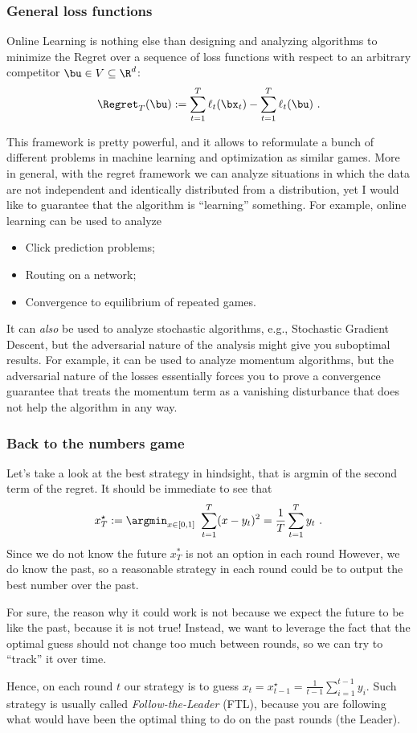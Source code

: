 \documentclass{beamer}
\begin{document}
\begin{frame}
  \frametitle{General loss functions}
Online Learning is nothing else than designing and analyzing algorithms to minimize the Regret over a sequence of loss functions with respect to an arbitrary competitor $\bu \in V\subseteq \R^d$:
\[
\Regret_T(\bu):=\sum_{t=1}^T \ell_t(\bx_t) - \sum_{t=1}^T \ell_t(\bu)~.
\]

This framework is pretty powerful, and it allows to reformulate a bunch of different problems in machine learning and optimization as similar games. More in general, with the regret framework we can analyze situations in which the data are not independent and identically distributed from a distribution, yet I would like to guarantee that the algorithm is ``learning'' something. For example, online learning can be used to analyze
\begin{itemize}
\item Click prediction problems;
\item Routing on a network;
\item Convergence to equilibrium of repeated games.
\end{itemize}
It can \emph{also} be used to analyze stochastic algorithms, e.g., Stochastic Gradient Descent, but the adversarial nature of the analysis might give you suboptimal results. For example, it can be used to analyze momentum algorithms, but the adversarial nature of the losses essentially forces you to prove a convergence guarantee that treats the momentum term as a vanishing disturbance that does not help the algorithm in any way.



\end{frame}


\begin{frame}
  \frametitle{Back to the numbers game}
  Let's take a look at the best strategy in hindsight, that is argmin of the second term of the regret. It should be immediate to see that
  \[
    x^\star_T := \argmin_{x \in [0,1]} \ \sum_{t=1}^T (x - y_t)^2 = \frac{1}{T} \sum_{t=1}^T y_t~.
  \]
  Since we do not know the future $x^*_T$ is not an option in each round
  However, we do know the past, so a reasonable strategy in each round could be to output the best number over the past.

  For sure, the reason why it could work is not because we expect the future to be like the past, because it is not true! Instead, we want to leverage the fact that the optimal guess should not change too much between rounds, so we can try to ``track'' it over time.

  Hence, on each round $t$ our strategy is to guess $x_t = x_{t-1}^\star=\frac{1}{t-1} \sum_{i=1}^{t-1} y_i$. Such strategy is usually called \emph{Follow-the-Leader} (FTL), because you are following what would have been the optimal thing to do on the past rounds (the Leader).


\end{frame}
\end{document}
